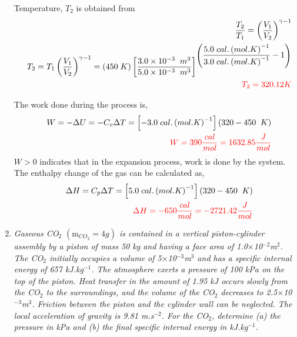 \begin{enumerate}
Temperature, $T_{2}$ is obtained from 
\begin{eqnarray}
&& \displaystyle\frac{T_{2}}{T_{1}} = \left(\displaystyle\frac{V_{1}}{V_{2}}\right)^{\gamma - 1} \nonumber \\
&& T_{2} = T_{1} \left(\displaystyle\frac{V_{1}}{V_{2}}\right)^{\gamma - 1 } = (450\;K)\left[\frac{3.0\times 10^{-3}\;\;m^{3}}{5.0\times 10^{-3}\;\;m^{3}}\right]^{\left(\displaystyle\frac{5.0\;cal.\left(mol.K\right)^{-1} }{3.0\; cal.\left(mol.K\right)^{-1}  }-1\right)} \nonumber \\
&& \textcolor{red}{T_{2} = 320.12 K} \nonumber
\end{eqnarray}

The work done during the process is,
\begin{eqnarray}
&& W = -\Delta U = - C_{v}\Delta T = \left[ -3.0\; cal.\left(mol.K\right)^{-1} \right] \left( 320 - 450 \;\;K\right) \nonumber \\
&& \textcolor{red}{W = 390 \displaystyle\frac{cal}{mol} = 1632.85 \displaystyle\frac{J}{mol}} \nonumber
\end{eqnarray}
$W>0$ indicates that in the expansion process, work is done by the system. The enthalpy change of the gas can be calculated as,
\begin{eqnarray}
&& \Delta H = C_{p}\Delta T = \left[ 5.0\; cal.\left(mol.K\right)^{-1} \right] \left( 320 - 450 \;\;K\right) \nonumber \\
&& \textcolor{red}{\Delta H = -650 \displaystyle\frac{cal}{mol} = -2721.42 \displaystyle\frac{J}{mol}} \nonumber 
\end{eqnarray}



\item {\it Gaseous CO$_{2}$ $\left(\text{m}_{CO_{2}}=4g\right)$ is contained in a vertical piston-cylinder assembly by a piston of mass 50 kg and having a face area of 1.0$\times$10$^{-2}$m$^{2}$. The CO$_{2}$ initially occupies a volume of 5$\times$10$^{-3}$m$^{3}$ and has a specific internal energy of 657 kJ.kg$^{-1}$.  The atmosphere exerts a pressure of 100 kPa on the top of the piston. Heat transfer in the amount  of 1.95 kJ occurs slowly from the CO$_{2}$ to the surroundings, and the volume of the CO$_{2}$ decreases to 2.5$\times$10$^{-3}$m$^{3}$. Friction between the piston and the cylinder wall can be neglected. The local acceleration of gravity is 9.81 m.s$^{-2}$. For the CO$_{2}$, determine (a) the pressure in kPa and (b) the final specific internal energy in kJ.kg$^{-1}$.}


\end{enumerate}
